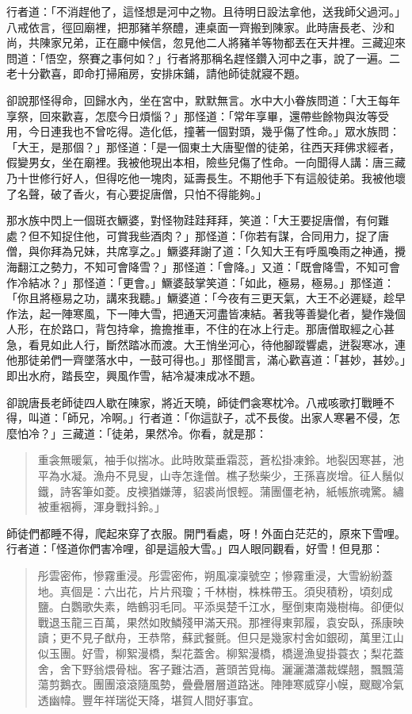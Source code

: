 行者道：「不消趕他了，這怪想是河中之物。且待明日設法拿他，送我師父過河。」八戒依言，徑回廟裡，把那豬羊祭醴，連桌面一齊搬到陳家。此時唐長老、沙和尚，共陳家兄弟，正在廳中候信，忽見他二人將豬羊等物都丟在天井裡。三藏迎來問道：「悟空，祭賽之事何如？」行者將那稱名趕怪鑽入河中之事，說了一遍。二老十分歡喜，即命打掃廂房，安排床鋪，請他師徒就寢不題。

卻說那怪得命，回歸水內，坐在宮中，默默無言。水中大小眷族問道：「大王每年享祭，回來歡喜，怎麼今日煩惱？」那怪道：「常年享畢，還帶些餘物與汝等受用，今日連我也不曾吃得。造化低，撞著一個對頭，幾乎傷了性命。」眾水族問：「大王，是那個？」那怪道：「是一個東土大唐聖僧的徒弟，往西天拜佛求經者，假變男女，坐在廟裡。我被他現出本相，險些兒傷了性命。一向聞得人講：唐三藏乃十世修行好人，但得吃他一塊肉，延壽長生。不期他手下有這般徒弟。我被他壞了名聲，破了香火，有心要捉唐僧，只怕不得能夠。」

那水族中閃上一個斑衣鱖婆，對怪物跬跬拜拜，笑道：「大王要捉唐僧，有何難處？但不知捉住他，可賞我些酒肉？」那怪道：「你若有謀，合同用力，捉了唐僧，與你拜為兄妹，共席享之。」鱖婆拜謝了道：「久知大王有呼風喚雨之神通，攪海翻江之勢力，不知可會降雪？」那怪道：「會降。」又道：「既會降雪，不知可會作冷結冰？」那怪道：「更會。」鱖婆鼓掌笑道：「如此，極易，極易。」那怪道：「你且將極易之功，講來我聽。」鱖婆道：「今夜有三更天氣，大王不必遲疑，趁早作法，起一陣寒風，下一陣大雪，把通天河盡皆凍結。著我等善變化者，變作幾個人形，在於路口，背包持傘，擔擔推車，不住的在冰上行走。那唐僧取經之心甚急，看見如此人行，斷然踏冰而渡。大王悄坐河心，待他腳蹤響處，迸裂寒冰，連他那徒弟們一齊墜落水中，一鼓可得也。」那怪聞言，滿心歡喜道：「甚妙，甚妙。」即出水府，踏長空，興風作雪，結冷凝凍成冰不題。

卻說唐長老師徒四人歇在陳家，將近天曉，師徒們衾寒枕冷。八戒咳歌打戰睡不得，叫道：「師兄，冷啊。」行者道：「你這獃子，忒不長俊。出家人寒暑不侵，怎麼怕冷？」三藏道：「徒弟，果然冷。你看，就是那：
\begin{quote}
重衾無暖氣，袖手似揣冰。此時敗葉垂霜蕊，蒼松掛凍鈴。地裂因寒甚，池平為水凝。漁舟不見叟，山寺怎逢僧。樵子愁柴少，王孫喜炭增。征人鬚似鐵，詩客筆如菱。皮襖猶嫌薄，貂裘尚恨輕。蒲團僵老衲，紙帳旅魂驚。繡被重裀褥，渾身戰抖鈴。」
\end{quote}

師徒們都睡不得，爬起來穿了衣服。開門看處，呀！外面白茫茫的，原來下雪哩。行者道：「怪道你們害冷哩，卻是這般大雪。」四人眼同觀看，好雪！但見那：
\begin{quote}
彤雲密佈，慘霧重浸。彤雲密佈，朔風凜凜號空；慘霧重浸，大雪紛紛蓋地。真個是：六出花，片片飛瓊；千林樹，株株帶玉。須臾積粉，頃刻成鹽。白鸚歌失素，皓鶴羽毛同。平添吳楚千江水，壓倒東南幾樹梅。卻便似戰退玉龍三百萬，果然如敗鱗殘甲滿天飛。那裡得東郭履，袁安臥，孫康映讀；更不見子猷舟，王恭幣，蘇武餐氈。但只是幾家村舍如銀砌，萬里江山似玉團。好雪，柳絮漫橋，梨花蓋舍。柳絮漫橋，橋邊漁叟掛蓑衣；梨花蓋舍，舍下野翁煨骨柮。客子難沽酒，蒼頭苦覓梅。灑灑瀟瀟裁蝶翹，飄飄蕩蕩剪鵝衣。團團滾滾隨風勢，疊疊層層道路迷。陣陣寒威穿小幙，颼颼冷氣透幽幃。豐年祥瑞從天降，堪賀人間好事宜。
\end{quote}

